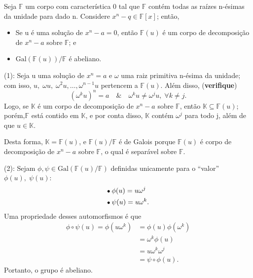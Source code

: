 \documentclass[../algebraIII_notes.tex]{subfiles}
\begin{document}
\begin{lemma*}
	Seja \(\mathbb{F}\) um corpo com característica 0 tal que \(\mathbb{F}\) contém todas as raízes n-ésimas da unidade para dado n. Considere \(x^{n} - q \in \mathbb{F}[x]\); então,
	\begin{itemize}
		\item[1)] Se u é uma solução de \(x^{n}-a=0\), então \(\mathbb{F}(u)\) é um corpo de decomposição de \(x^{n}-a\) sobre \(\mathbb{F}\); e
		\item[2)] \(\mathrm{Gal}(\mathbb{F}(u))/\mathbb{F}\) é abeliano.
	\end{itemize}
\end{lemma*}
\begin{proof*}
	(1): Seja u uma solução de \(x^{n} = a\) e \(\omega \) uma raiz primitiva n-ésima da unidade; com isso, \(u,\; \omega u,\; \omega^{2}u, \dotsc , \omega^{n-1}u\) pertencem a \(\mathbb{F}(u)\). Além disso, (\textbf{verifique})
	\[
		(\omega^{k}u)^{n} = a \quad\&\quad \omega^{k}u\neq \omega^{j}u,\; \forall k\neq j.
	\]
	Logo, se \(\mathbb{K}\) é um corpo de decomposição de \(x^{n}-a\) sobre \(\mathbb{F}\), então \(\mathbb{K}\subseteq \mathbb{F}(u)\); porém,\linebreak \(\mathbb{F}\) está contido em \(\mathbb{K}\), e por conta disso, \(\mathbb{K}\) contém \(\omega^{j}\) para todo j, além de que \(u\in \mathbb{K}\).

	Desta forma, \(\mathbb{K} = \mathbb{F}(u)\), e \(\mathbb{F}(u)/\mathbb{F}\) é de Galois porque \(\mathbb{F}(u)\) é corpo de decomposição de \(x^{n}-a\) sobre \(\mathbb{F}\), o qual é separável sobre \(\mathbb{F}\).

	(2): Sejam \(\phi , \psi \in \mathrm{Gal}(\mathbb{F}(u)/\mathbb{F})\) definidas unicamente para o ``valor'' \(\phi (u),\; \psi (u)\):
	\begin{align*}
		 & \tikz[baseline=-0.5ex]\draw[black, fill=black, radius=1.5pt](0, 0)circle;\; \phi (u) = u\omega^{j} \\
		 & \tikz[baseline=-0.5ex]\draw[black, fill=black, radius=1.5pt](0, 0)circle;\; \psi (u)=u\omega^{k}.
	\end{align*}
	Uma propriedade desses automorfismos é que
	\begin{align*}
		\phi \circ \psi (u) = \phi (u\omega ^{k}) & = \phi (u)\phi (\omega^{k}) \\
		                                          & = \omega^{k}\phi (u)        \\
		                                          & = u\omega^{k}\omega^{j}     \\
		                                          & = \psi \circ \phi (u).
	\end{align*}
	Portanto, o grupo é abeliano. \qedsymbol
\end{proof*}
\end{document}
